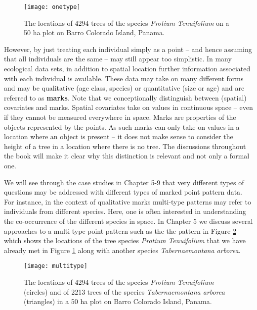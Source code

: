 \begin{figure}[h]
\begin{center}
\texttt{[image: onetype]}
\end{center}
\caption{The locations of $4294$ trees of the species \textit{Protium Tenuifolium} on a 50 ha plot on Barro Colorado Island, Panama.}
\label{chap1:fig2}
\end{figure}

However, by just treating each individual simply as a point -- and hence assuming that all individuals are the same -- may still appear too simplistic. In many ecological data sets, in addition to spatial location further information associated with each individual is available. These data may take on many different forms and may be qualitative (age class, species) or quantitative (size or age) and are referred to as \textbf{marks}.  Note that we conceptionally distinguish between (spatial) covariates and marks. Spatial covariates take on values in continuous space -- even if they cannot be measured everywhere in space. Marks are properties of the objects represented by the points. As such marks can only take on values in a location where an object is present -- it does not make sense to consider the height of a tree in a location where there is no tree. The discussions throughout the book will make it clear why this distinction is relevant and not only a formal one.

We will see through the case studies in Chapter 5-9 that very different types of questions may be addressed with different types of marked point pattern data. For instance, in the context of qualitative marks multi-type patterns may refer to individuals from different species. Here, one is often interested in understanding the co-occurrence of the different species  in space.  In Chapter 5 we discuss several approaches to a multi-type point pattern such as the the pattern in  Figure \ref{chap1:fig3} which shows the locations of the tree species \textit{Protium Tenuifolium} that we have already met in  Figure \ref{chap1:fig2} along with another species \textit{Tabernaemontana arborea}.
\begin{figure}[h]
\begin{center}
\texttt{[image: multitype]}
\end{center}
\caption{The locations of 4294 trees of the species \textit{Protium Tenuifolium} (circles) and of 2213 trees of the species \textit{Tabernaemontana arborea} (triangles) in a 50 ha plot on Barro Colorado Island, Panama.}
\label{chap1:fig3}
\end{figure}

